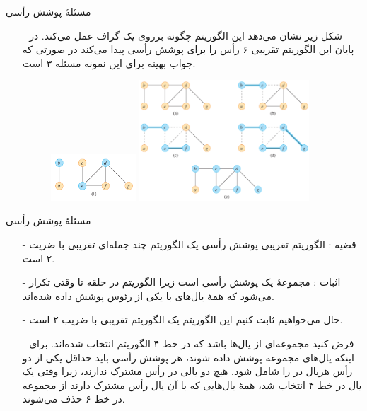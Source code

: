 \begin{frame}{‌مسئلهٔ پوشش رأسی}
\begin{itemize}\itemr
\item[-]
شکل زیر نشان می‌دهد این الگوریتم چگونه برروی یک گراف عمل می‌کند.
در پایان این الگوریتم تقریبی ۶ رأس را برای پوشش رأسی پیدا می‌کند در صورتی که جواب بهینه برای این نمونه مسئله ۳ است.
\begin{figure}
\includegraphics[width=0.3\textwidth]{figs/np-completeness/1108-vertex-cover-res}
\includegraphics[width=0.6\textwidth]{figs/np-completeness/1108-vertex-cover}
\end{figure}
\end{itemize}
\end{frame}


\begin{frame}{‌مسئلهٔ پوشش رأسی}
\begin{itemize}\itemr
\item[-]
قضیه : الگوریتم تقریبی پوشش رأسی یک الگوریتم چند جمله‌ای تقریبی با ضریت ۲ است.
\item[-]
اثبات : مجموعهٔ
یک پوشش رأسی است زیرا الگوریتم در حلقه تا وقتی تکرار می‌شود که همهٔ یال‌های
با یکی از رئوس
پوشش داده شده‌اند.
\item[-]
حال می‌خواهیم ثابت کنیم این الگوریتم یک الگوریتم تقریبی با ضریب ۲ است.
\item[-]
فرض کنید
مجموعه‌ای از یال‌ها باشد که در خط ۴ الگوریتم انتخاب شده‌اند. برای اینکه یال‌های مجموعه
پوشش داده شوند، هر پوشش رأسی باید حداقل یکی از دو رأس هریال در
را شامل شود. هیچ دو یالی در
رأس مشترک ندارند، زیرا وقتی یک یال در خط ۴ انتخاب شد، همهٔ یال‌هایی که با آن یال رأس مشترک دارند از مجموعه
در خط ۶ حذف می‌شوند.
\end{itemize}
\end{frame}


